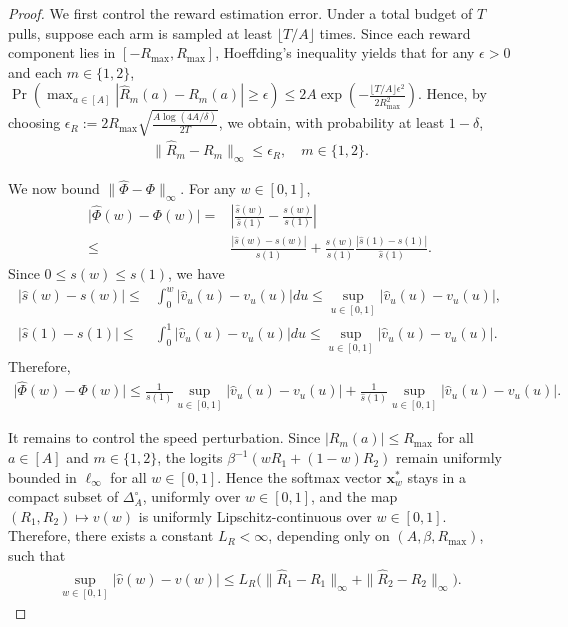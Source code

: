 \documentclass{article}
\newcommand{\bx}{\mathbf{x}}
\newcommand{\Farc}{\Phi}
\newcommand{\hatFarc}{\hat{\Phi}}
\begin{document}
\begin{proof}
We first control the reward estimation error.
Under a total budget of $T$ pulls, suppose each arm is sampled at least
$\lfloor T/A\rfloor$ times. Since each reward component lies in
$[-R_{\max},R_{\max}]$, Hoeffding's inequality yields that for any $\epsilon>0$ and
each $m\in\{1,2\}$,
$
\Pr \left(
\max_{a\in[A]} |\hat R_m(a)-R_m(a)| \ge \epsilon
\right)
\le
2A \exp \left(
-\frac{\lfloor T/A\rfloor \epsilon^2}{2R_{\max}^2}
\right).
$
Hence, by choosing $\epsilon_R
:=
2R_{\max}\sqrt{\frac{A\log(4A/\delta)}{2T}}$,
we obtain, with probability at least $1-\delta$,
\begin{align}
\|\hat R_m-R_m\|_\infty \le \epsilon_R,
\quad m\in\{1,2\}.
\label{eq:bandit_R_uniform_bound}
\end{align}

We now bound $\|\hatFarc-\Farc\|_\infty$. For any $w\in[0,1]$,
\begin{align*}
\big|\hatFarc(w)-\Farc(w)\big|
= & 
\left|\frac{\hat s(w)}{\hat s(1)}-\frac{s(w)}{s(1)}\right| \\
\leq &
\frac{|\hat s(w)-s(w)|}{s(1)}
+
\frac{s(w)}{s(1)}\frac{| \hat s(1)-s(1) |}{\hat s(1)}.
\end{align*}
Since $0\le s(w)\le s(1)$, we have
\begin{align*}
|\hat s(w)-s(w)|
\leq &
\int_0^w |\hat v_u(u)-v_u(u)| du
\le
\sup_{u\in[0,1]} |\hat v_u(u)-v_u(u)|,
\\
|\hat s(1)-s(1)|
\leq &
\int_0^1 |\hat v_u(u)-v_u(u)| du
\le
\sup_{u\in[0,1]} |\hat v_u(u)-v_u(u)|.
\end{align*}
Therefore,
\begin{align}
\big|\hatFarc(w)-\Farc(w)\big|
\le
\frac{1}{s(1)}\sup_{u\in[0,1]} |\hat v_u(u)-v_u(u)|
+
\frac{1}{\hat s(1)}\sup_{u\in[0,1]} |\hat v_u(u)-v_u(u)|.
\label{eq:Farc_diff_pre_event}
\end{align}

It remains to control the speed perturbation.
Since $|R_m(a)|\le R_{\max}$ for all $a\in[A]$ and $m\in\{1,2\}$,
the logits $\beta^{-1}(wR_1+(1-w)R_2)$ remain uniformly bounded in $\ell_\infty$
for all $w\in[0,1]$. Hence the softmax vector $\bx_w^*$ stays in a compact subset
of $\Delta_A^\circ$, uniformly over $w\in[0,1]$, and the map
$(R_1,R_2)\mapsto v(w)$ is uniformly Lipschitz-continuous over $w\in[0,1]$.
Therefore, there exists a constant $L_R<\infty$, depending only on
$(A,\beta,R_{\max})$, such that
\begin{align}
\sup_{w\in[0,1]} |\hat v(w)-v(w)|
\le
L_R\big(\|\hat R_1-R_1\|_\infty+\|\hat R_2-R_2\|_\infty\big).
\label{eq:bandit_speed_lipschitz}
\end{align}


\end{proof}
\end{document}
